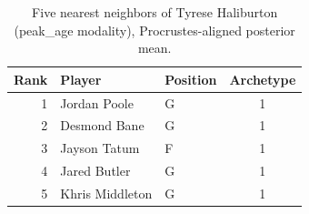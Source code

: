 \begin{table}[htbp]
  \centering\small
  \begin{tabular}{rllc}
    \toprule
    Rank & Player & Position & Archetype \\
    \midrule
    1 & Jordan Poole & G & 1 \\
    2 & Desmond Bane & G & 1 \\
    3 & Jayson Tatum & F & 1 \\
    4 & Jared Butler & G & 1 \\
    5 & Khris Middleton & G & 1 \\
    \bottomrule
  \end{tabular}
  \caption{Five nearest neighbors of Tyrese Haliburton (peak_age modality), Procrustes-aligned posterior mean.}
  \label{tab:Tyrese_Haliburton_neighbors_peak_age}
\end{table}

